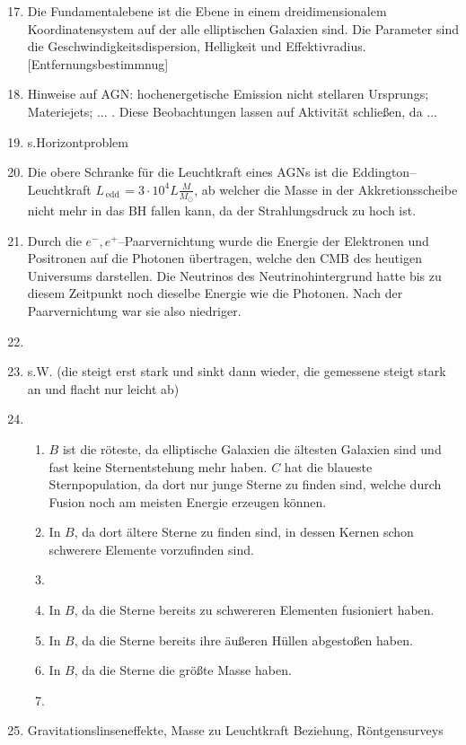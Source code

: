 \documentclass[a4paper,12pt]{article}
\numberwithin{equation}{section}
\begin{document}
\begin{enumerate}[label=\arabic*.]
        \setcounter{enumi}{16}
        \item Die Fundamentalebene ist die Ebene in einem dreidimensionalem Koordinatensystem auf der alle elliptischen Galaxien sind. Die Parameter sind die Geschwindigkeitsdispersion, Helligkeit und Effektivradius. [Entfernungsbestimmnug]
        \item Hinweise auf AGN: hochenergetische Emission nicht stellaren Ursprungs; Materiejets; ... . Diese Beobachtungen lassen auf Aktivität schließen, da ...
        \item s.Horizontproblem
        \item Die obere Schranke für die Leuchtkraft eines AGNs ist die Eddington--Leuchtkraft $L_{\,\text{edd}\,}=3\cdot 10^4L\tfrac{M}{M_\odot}$, ab welcher die Masse in der Akkretionsscheibe nicht mehr in das BH fallen kann, da der Strahlungsdruck zu hoch ist.
        \item Durch die $e^-,e^+$--Paarvernichtung wurde die Energie der Elektronen und Positronen auf die Photonen übertragen, welche den CMB des heutigen Universums darstellen. Die Neutrinos des Neutrinohintergrund hatte bis zu diesem Zeitpunkt noch dieselbe Energie wie die Photonen. Nach der Paarvernichtung war sie also niedriger.
        \item 
        \item s.W. (die steigt erst stark und sinkt dann wieder, die gemessene steigt stark an und flacht nur leicht ab)
        \item \begin{enumerate}[label=\alph*)]
                \item $B$ ist die röteste, da elliptische Galaxien die ältesten Galaxien sind und fast keine Sternentstehung mehr haben. $C$ hat die blaueste Sternpopulation, da dort nur junge Sterne zu finden sind, welche durch Fusion noch am meisten Energie erzeugen können.
                \item In $B$, da dort ältere Sterne zu finden sind, in dessen Kernen schon schwerere Elemente vorzufinden sind.
                \item
                \item In $B$, da die Sterne bereits zu schwereren Elementen fusioniert haben.
                \item In $B$, da die Sterne bereits ihre äußeren Hüllen abgestoßen haben.
                \item In $B$, da die Sterne die größte Masse haben.
                \item 
        \end{enumerate}
        \item Gravitationslinseneffekte, Masse zu Leuchtkraft Beziehung, Röntgensurveys
\end{enumerate}
\end{document}
